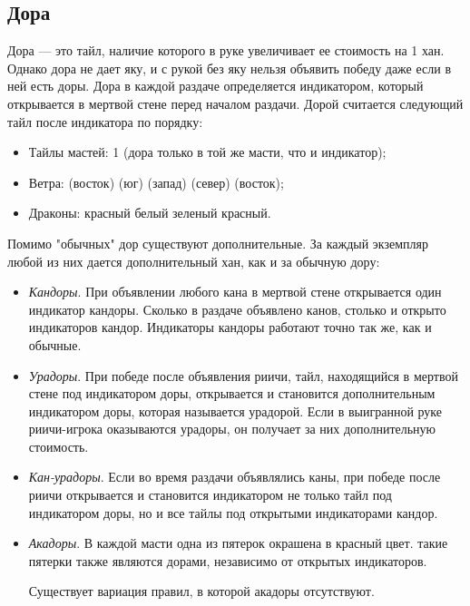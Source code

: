 \subsection{Дора}

Дора --- это тайл, наличие которого в руке увеличивает ее стоимость на 1 хан. Однако дора не дает яку, и с рукой без яку нельзя объявить победу даже если в ней есть доры. Дора в каждой раздаче определяется индикатором, который открывается в мертвой стене перед началом раздачи. Дорой считается следующий тайл после индикатора по порядку:
\begin{itemize}
	\item Тайлы мастей: 1 (дора только в той же масти, что и индикатор);
	\item Ветра:  (восток)\rightarrow
	 (юг)\rightarrow
	 (запад)\rightarrow
	 (север)\rightarrow
	 (восток);
	\item Драконы: красный\rightarrow
	белый\rightarrow
	зеленый\rightarrow
	красный.
\end{itemize}

Помимо "обычных" дор существуют дополнительные. За каждый экземпляр любой из них дается дополнительный хан, как и за обычную дору:
\begin{itemize}
	\item \textit{Кандоры}. При объявлении любого кана в мертвой стене открывается один индикатор кандоры. Сколько в раздаче объявлено канов, столько и открыто индикаторов кандор. Индикаторы кандоры  работают точно так же, как и обычные.
	\item \textit{Урадоры}. При победе после объявления риичи, тайл, находящийся в мертвой стене под индикатором доры, открывается и становится дополнительным индикатором доры, которая называется урадорой. Если в выигранной руке риичи-игрока оказываются урадоры, он получает за них дополнительную стоимость.
	\item \textit{Кан-урадоры}. Если во время раздачи объявлялись каны, при победе после риичи открывается и становится индикатором не только тайл под индикатором доры, но и все тайлы под открытыми индикаторами кандор. 
	\item\textit{Акадоры}. В каждой масти одна из пятерок окрашена в красный цвет. такие пятерки также являются дорами, независимо от открытых индикаторов.
	
	\begin{additional}
		
		Существует вариация правил, в которой акадоры отсутствуют.
		
	\end{additional}
	
\end{itemize}

